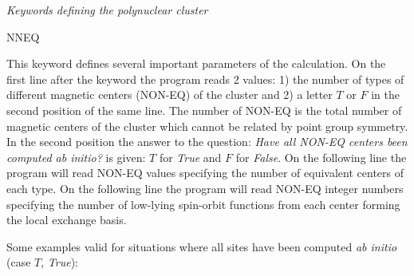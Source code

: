 \textit{Keywords defining the polynuclear cluster}
\begin{keywordlist}
\item[NNEQ]

This keyword defines several important parameters of the calculation. On the
first line after the keyword the program reads 2 values:
1) the number of types of different magnetic centers (NON-EQ) of the cluster and
2) a letter $T$ or $F$ in the second position of the same line.
The number of NON-EQ is the total number of magnetic centers of the cluster
which cannot be related by point group symmetry.
In the second position the answer to the question: \textit{Have all NON-EQ centers been computed ab initio?}
is given: $T$ for \textit{True} and $F$ for \textit{False}.
On the following line the program will read NON-EQ values specifying the
number of equivalent centers of each type.
On the following line the program will read NON-EQ integer numbers specifying
the number of low-lying spin-orbit functions from each center forming the local
exchange basis.

Some examples valid for situations where all sites have been
computed \textit {ab initio} (case $T$, \textit {True}):


\end{keywordlist}
